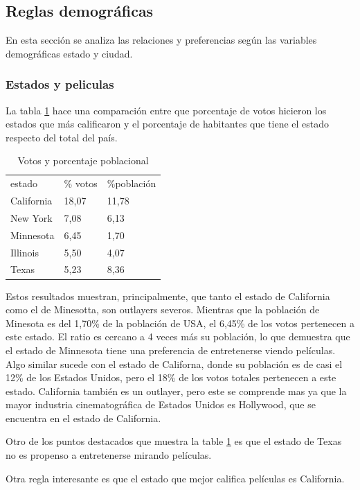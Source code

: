 \documentclass[journal]{IEEEtran}
\begin{document}
\subsection{Reglas demográficas}
En esta sección se analiza las relaciones y preferencias según las variables 
demográficas estado y ciudad. 

\subsubsection{Estados y peliculas}
La tabla \ref{table_state_population} hace una comparación entre que porcentaje
de votos hicieron los estados que más calificaron y el porcentaje de habitantes
que tiene el estado respecto del total del país.

\begin{table}[ht!]
\caption{Votos y porcentaje poblacional}
\label{table_state_population}
\centering
\begin{tabular}{l l l}
estado & \% votos & \%población  \\
California & 18,07 & 11,78 \\
New York & 7,08 & 6,13 \\
Minnesota & 6,45 & 1,70 \\
Illinois & 5,50 & 4,07 \\
Texas & 5,23 & 8,36
\end{tabular}
\end{table}

Estos resultados muestran, principalmente, que tanto el estado de California
como el de Minesotta, son outlayers severos. Mientras que la población de
Minesota es del 1,70\% de la población de USA, el 6,45\% de los votos pertenecen
a este estado. El ratio es cercano a 4 veces más su población, lo que demuestra
que el estado de Minnesota tiene una preferencia de entretenerse viendo películas.
Algo similar sucede con el estado de Californa, donde su población es de casi el
12\% de los Estados Unidos, pero el 18\% de los votos totales pertenecen a este
estado. California también es un outlayer, pero este se comprende mas ya que la
mayor industria cinematográfica de Estados Unidos es Hollywood, que se encuentra
en el estado de California.

Otro de los puntos destacados que muestra la table \ref{table_state_population} es
que el estado de Texas no es propenso a entretenerse mirando películas.

Otra regla interesante es que el estado que mejor califica películas es California.
\end{document}
